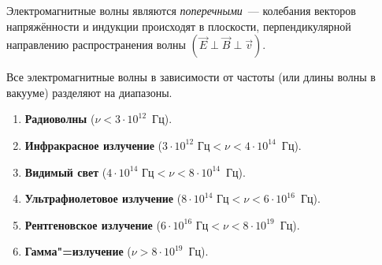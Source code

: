 \documentclass[main.tex]{subfiles}
\begin{document}
\begin{NoHyper}
Электромагнитные волны являются \emph{поперечными}~--- колебания векторов напряжённости и индукции происходят в плоскости, перпендикулярной направлению распространения волны $(\vec E\perp\vec B\perp\vec v)$.

Все электромагнитные волны в зависимости от частоты (или длины волны в вакууме) разделяют на диапазоны.
\begin{enumerate}
    \item \textbf{Радиоволны} ($\nu<3\cdot10^{12}$~Гц).
    \item \textbf{Инфракрасное излучение} ($3\cdot10^{12}\text{~Гц}<\nu<4\cdot10^{14}$~Гц).
    \item \textbf{Видимый свет} ($4\cdot10^{14}\text{~Гц}<\nu<8\cdot10^{14}$~Гц).
    \item \textbf{Ультрафиолетовое излучение} ($8\cdot10^{14}\text{~Гц}<\nu<6\cdot10^{16}$~Гц).
    \item \textbf{Рентгеновское излучение} ($6\cdot10^{16}\text{~Гц}<\nu<8\cdot10^{19}$~Гц).
    \item \textbf{Гамма"=излучение} ($\nu>8\cdot10^{19}$~Гц).
\end{enumerate}








\end{NoHyper}
\end{document}
